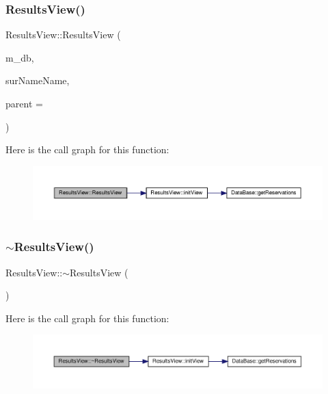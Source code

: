 \subsubsection{\texorpdfstring{Results\+View()}{ResultsView()}}
{\footnotesize\ttfamily Results\+View\+::\+Results\+View (\begin{DoxyParamCaption}\item[{\hyperlink{class_data_base}{Data\+Base} $\ast$}]{m\+\_\+db,  }\item[{std\+::string}]{sur\+Name\+Name,  }\item[{Q\+Widget $\ast$}]{parent = {} }\end{DoxyParamCaption})\hspace{0.3cm}{\ttfamily [explicit]}}

Here is the call graph for this function\+:\nopagebreak
\begin{figure}[H]
\begin{center}
\leavevmode
\includegraphics[width=350pt]{class_results_view_a1019cb09ad177a74227ea30e6630e4bf_cgraph}
\end{center}
\end{figure}
\mbox{\label{class_results_view_af9caa8995848c6e05e8486ad1aac8856}} 
\subsubsection{\texorpdfstring{$\sim$\+Results\+View()}{~ResultsView()}}
{\footnotesize\ttfamily Results\+View\+::$\sim$\+Results\+View (\begin{DoxyParamCaption}{ }\end{DoxyParamCaption})\hspace{0.3cm}{\ttfamily [inline]}}

Here is the call graph for this function\+:\nopagebreak
\begin{figure}[H]
\begin{center}
\leavevmode
\includegraphics[width=350pt]{class_results_view_af9caa8995848c6e05e8486ad1aac8856_cgraph}
\end{center}
\end{figure}


